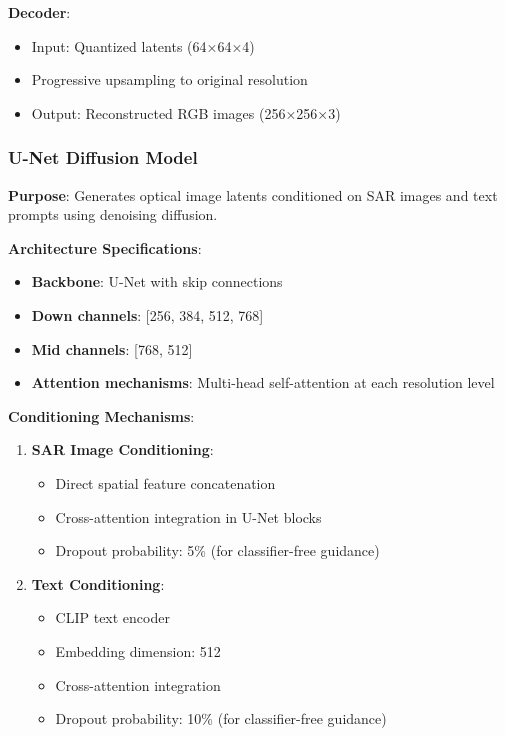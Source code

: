 \textbf{Decoder}:
\begin{itemize}
    \item Input: Quantized latents (64×64×4)
    \item Progressive upsampling to original resolution
    \item Output: Reconstructed RGB images (256×256×3)
\end{itemize}

\subsubsection{U-Net Diffusion Model}

\textbf{Purpose}: Generates optical image latents conditioned on SAR images and text prompts using denoising diffusion.

\textbf{Architecture Specifications}:
\begin{itemize}
    \item \textbf{Backbone}: U-Net with skip connections
    \item \textbf{Down channels}: [256, 384, 512, 768]
    \item \textbf{Mid channels}: [768, 512]
    \item \textbf{Attention mechanisms}: Multi-head self-attention at each resolution level
\end{itemize}

\textbf{Conditioning Mechanisms}:

\begin{enumerate}
    \item \textbf{SAR Image Conditioning}:
    \begin{itemize}
        \item Direct spatial feature concatenation
        \item Cross-attention integration in U-Net blocks
        \item Dropout probability: 5\% (for classifier-free guidance)
    \end{itemize}
    
    \item \textbf{Text Conditioning}:
    \begin{itemize}
        \item CLIP text encoder
        \item Embedding dimension: 512
        \item Cross-attention integration
        \item Dropout probability: 10\% (for classifier-free guidance)
    \end{itemize}
\end{enumerate}

